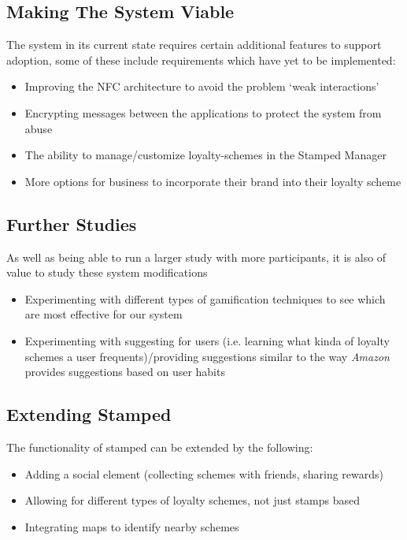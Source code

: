 \subsection{Making The System Viable}
The system in its current state requires certain additional features to support adoption, some of these include requirements which have yet to be implemented:
\begin{itemize}
	\item Improving the NFC architecture to avoid the problem `weak interactions'
	\item Encrypting messages between the applications to protect the system from abuse
	\item The ability to manage/customize loyalty-schemes in the Stamped Manager
	\item More options for business to incorporate their brand into their loyalty scheme
\end{itemize}

\subsection{Further Studies}
As well as being able to run a larger study with more participants, it is also of value to study these system modifications
\begin{itemize}
	\item Experimenting with different types of gamification techniques to see which are most effective for our system
	\item Experimenting with suggesting for users (i.e. learning what kinda of loyalty schemes a user frequents)/providing suggestions similar to the way \emph{Amazon} provides suggestions based on user habits
\end{itemize}

\subsection{Extending Stamped}
The functionality of stamped can be extended by the following:
\begin{itemize}
	\item Adding a social element (collecting schemes with friends, sharing rewards)
	\item Allowing for different types of loyalty schemes, not just stamps based
	\item Integrating maps to identify nearby schemes
\end{itemize}

